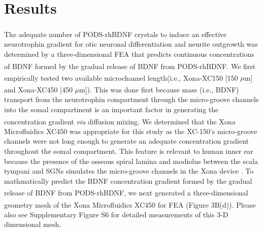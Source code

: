 \documentclass[review]{elsarticle}
\begin{document}
\section{Results}
The adequate number of PODS\textsuperscript{\textregistered}-rhBDNF crystals to induce an effective neurotrophin gradient for otic neuronal differentiation and neurite outgrowth was determined by a three-dimensional FEA that predicts continuous concentrations of BDNF formed by the gradual release of BDNF from PODS\textsuperscript{\textregistered}-rhBDNF. We first empirically tested two available microchannel length\textemdash (i.e., Xona\textsuperscript{\texttrademark}-XC150 [150 $\mu$m] and Xona\textsuperscript{\texttrademark}-XC450 [450 $\mu$m]). This was done first because mass (i.e., BDNF) transport from the neurotrophin compartment through the micro-groove channels into the somal compartment is an important factor in generating the concentration gradient \textit{via} diffusion mixing.  We determined that the Xona\textsuperscript{\texttrademark} Microfluidics XC450 was appropriate for this study as the XC-150's micro-groove channels were not long enough to generate an adequate concentration gradient throughout the somal compartment. This feature is relevant to human inner ear because the presence of the osseous spiral lamina and modiolus between the scala tympani and SGNs simulates the micro-groove channels in the Xona device \cite{Tuncel2005,Kucuk1991a}. To mathmatically predict the BDNF concentration gradient formed by the gradual release of BDNF from PODS\textsuperscript{\textregistered}-rhBDNF, we next generated a three-dimensional geometry mesh of the Xona\textsuperscript{\texttrademark} Microfluidics XC450 for FEA (Figure 3B(d)). Please also see Supplementary Figure S6 for detailed measurements of this 3-D dimensional mesh. 
\end{document}
